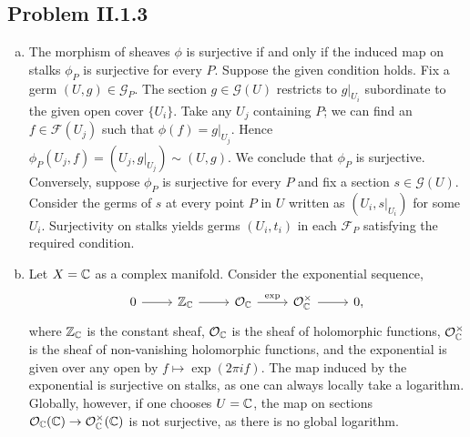 \documentclass{mathnotes}
\begin{document}
\subsection*{Problem II.1.3}
\begin{enumerate}[(a)]
    \item The morphism of sheaves $\phi$ is surjective if and only if the induced map on stalks $\phi_P$ is surjective for every $P$.
        Suppose the given condition holds. Fix a germ $(U,g)\in\mathcal{G}_P$. The section $g\in\mathcal{G}(U)$ restricts
        to $g|_{U_i}$ subordinate to the given open cover $\{U_i\}$. Take any $U_j$ containing $P$; we can find an $f\in\mathcal{F}(U_j)$
        such that $\phi(f)=g|_{U_j}$. Hence $\phi_P(U_j,f)=(U_j,g|_{U_j})\sim(U,g)$. We conclude that $\phi_P$ is surjective.
        Conversely, suppose $\phi_P$ is surjective for every $P$ and fix a section $s\in\mathcal{G}(U)$. Consider the germs
        of $s$ at every point $P$ in $U$ written as $(U_i,s|_{U_i})$ for some $U_i$. Surjectivity on stalks yields germs
        $(U_i,t_i)$ in each $\mathcal{F}_P$ satisfying the required condition.
    \item Let $X=\mathbb{C}$ as a complex manifold. Consider the exponential sequence,
        \begin{equation*}
            \begin{tikzcd}
                0\ar{r} & \Z_\C\ar{r} & \mathcal{O}_\C\ar{r}{\exp} & \mathcal{O}_\C^\times\ar{r} & 0,
            \end{tikzcd}
        \end{equation*}
        where $\mathbb{Z}_{\mathbb{C}}$ is the constant sheaf, $\mathcal{O}_{\mathbb{C}}$ is the sheaf of holomorphic functions, $\mathcal{O}_{\mathbb{C}}^\times$
        is the sheaf of non-vanishing holomorphic functions, and the exponential is given over any open by $f\mapsto \exp(2\pi i f)$.
        The map induced by the exponential is surjective on stalks, as one can always locally take a logarithm.
        Globally, however, if one chooses $U=\mathbb{C}$, the map on sections $\mathcal{O}_{\mathbb{C}}(\mathbb{C})\to\mathcal{O}_{\mathbb{C}}^\times(\mathbb{C})$ is not surjective,
        as there is no global logarithm.
\end{enumerate}
\end{document}
